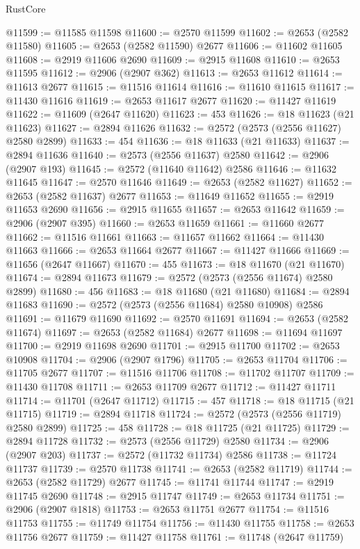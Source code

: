 \begin{lexlean}{RustCore}
\begin{coremodule}
@11599 := @11585 @11598
@11600 := @2570 @11599
@11602 := @2653 (@2582 @11580)
@11605 := @2653 (@2582 @11590) @2677
@11606 := @11602 @11605
@11608 := @2919 @11606 @2690
@11609 := @2915 @11608
@11610 := @2653 @11595
@11612 := @2906 (@2907 @362)
@11613 := @2653 @11612
@11614 := @11613 @2677
@11615 := @11516 @11614
@11616 := @11610 @11615
@11617 := @11430 @11616
@11619 := @2653 @11617 @2677
@11620 := @11427 @11619
@11622 := @11609 (@2647 @11620)
@11623 := 453
@11626 := @18 @11623 (@21 @11623)
@11627 := @2894 @11626
@11632 := @2572 (@2573 (@2556 @11627) @2580 @2899)
@11633 := 454
@11636 := @18 @11633 (@21 @11633)
@11637 := @2894 @11636
@11640 := @2573 (@2556 @11637) @2580
@11642 := @2906 (@2907 @193)
@11645 := @2572 (@11640 @11642) @2586
@11646 := @11632 @11645
@11647 := @2570 @11646
@11649 := @2653 (@2582 @11627)
@11652 := @2653 (@2582 @11637) @2677
@11653 := @11649 @11652
@11655 := @2919 @11653 @2690
@11656 := @2915 @11655
@11657 := @2653 @11642
@11659 := @2906 (@2907 @395)
@11660 := @2653 @11659
@11661 := @11660 @2677
@11662 := @11516 @11661
@11663 := @11657 @11662
@11664 := @11430 @11663
@11666 := @2653 @11664 @2677
@11667 := @11427 @11666
@11669 := @11656 (@2647 @11667)
@11670 := 455
@11673 := @18 @11670 (@21 @11670)
@11674 := @2894 @11673
@11679 := @2572 (@2573 (@2556 @11674) @2580 @2899)
@11680 := 456
@11683 := @18 @11680 (@21 @11680)
@11684 := @2894 @11683
@11690 := @2572 (@2573 (@2556 @11684) @2580 @10908) @2586
@11691 := @11679 @11690
@11692 := @2570 @11691
@11694 := @2653 (@2582 @11674)
@11697 := @2653 (@2582 @11684) @2677
@11698 := @11694 @11697
@11700 := @2919 @11698 @2690
@11701 := @2915 @11700
@11702 := @2653 @10908
@11704 := @2906 (@2907 @1796)
@11705 := @2653 @11704
@11706 := @11705 @2677
@11707 := @11516 @11706
@11708 := @11702 @11707
@11709 := @11430 @11708
@11711 := @2653 @11709 @2677
@11712 := @11427 @11711
@11714 := @11701 (@2647 @11712)
@11715 := 457
@11718 := @18 @11715 (@21 @11715)
@11719 := @2894 @11718
@11724 := @2572 (@2573 (@2556 @11719) @2580 @2899)
@11725 := 458
@11728 := @18 @11725 (@21 @11725)
@11729 := @2894 @11728
@11732 := @2573 (@2556 @11729) @2580
@11734 := @2906 (@2907 @203)
@11737 := @2572 (@11732 @11734) @2586
@11738 := @11724 @11737
@11739 := @2570 @11738
@11741 := @2653 (@2582 @11719)
@11744 := @2653 (@2582 @11729) @2677
@11745 := @11741 @11744
@11747 := @2919 @11745 @2690
@11748 := @2915 @11747
@11749 := @2653 @11734
@11751 := @2906 (@2907 @1818)
@11753 := @2653 @11751 @2677
@11754 := @11516 @11753
@11755 := @11749 @11754
@11756 := @11430 @11755
@11758 := @2653 @11756 @2677
@11759 := @11427 @11758
@11761 := @11748 (@2647 @11759)

\end{coremodule}
\end{lexlean}
